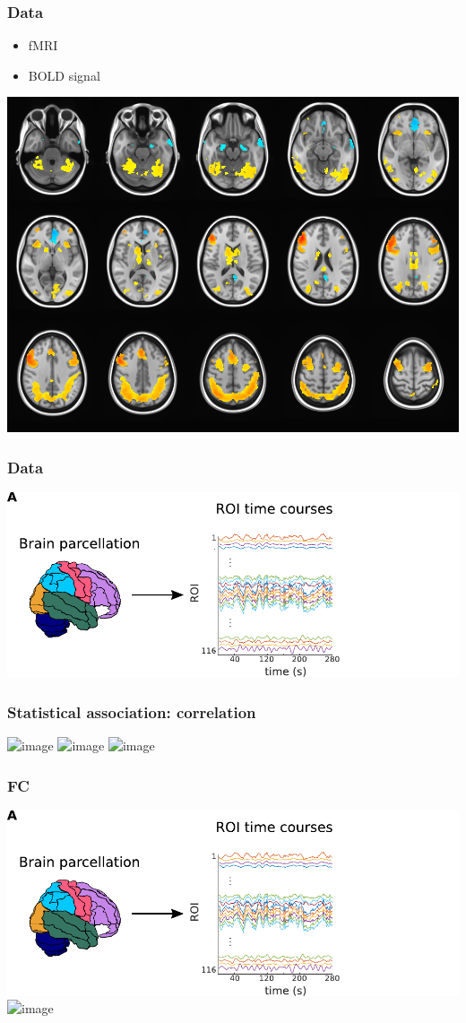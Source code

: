 \documentclass[final]{beamer}
\begin{document}
\begin{frame}
\frametitle{Data}
\begin{itemize}
	\item fMRI
	\item BOLD signal
\end{itemize}
\begin{center}
\includegraphics[width=0.7\columnwidth]{fmri}
\end{center}

\end{frame}

\begin{frame}
\frametitle{Data}
\begin{center}
\includegraphics[width=0.8\columnwidth]{fig1b}
\end{center}
\end{frame}

\begin{frame}
\frametitle{Statistical association: correlation}
\begin{center}
\includegraphics<1>[width=0.9\columnwidth]{correlation}
\includegraphics<2>[width=0.5\columnwidth]{toy_FC}
\includegraphics<3>[width=0.8\columnwidth]{correlation_xkcd}
\end{center}
\end{frame}

\begin{frame}
\frametitle{FC}
\begin{center}
\includegraphics<1>[width=0.8\columnwidth]{fig1b}
\includegraphics<2>[width=0.8\columnwidth]{fig1a}
\end{center}
\end{frame}
\end{document}
